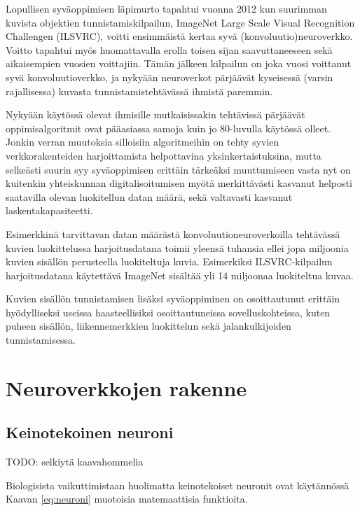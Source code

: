 \documentclass[finnish]{tktltiki2}
\theoremstyle{definition}
\theoremstyle{remark}
\begin{document}
  Lopullisen syväoppimisen läpimurto tapahtui vuonna 2012 kun suurimman kuvista objektien tunnistamiskilpailun, ImageNet Large Scale Visual Recognition Challengen (ILSVRC), voitti ensimmäistä kertaa syvä (konvoluutio)neuroverkko. Voitto tapahtui myös huomattavalla erolla toisen sijan saavuttaneeseen sekä aikaisempien vuosien voittajiin. Tämän jälkeen kilpailun on joka vuosi voittanut syvä konvoluutioverkko, ja nykyään neuroverkot pärjäävät kyseisessä (varsin rajallisessa) kuvasta tunnistamistehtävässä ihmistä paremmin.

  Nykyään käytössä olevat ihmisille mutkaisissakin tehtävissä pärjäävät oppimisalgoritmit ovat pääasiassa samoja kuin jo 80-luvulla käytössä olleet. Jonkin verran muutoksia silloisiin algoritmeihin on tehty syvien verkkorakenteiden harjoittamista helpottavina yksinkertaistuksina, mutta selkeästi suurin syy syväoppimisen erittäin tärkeäksi muuttumiseen vasta nyt on kuitenkin yhteiskunnan digitalisoitumisen myötä merkittävästi kasvanut helposti saatavilla olevan luokitellun datan määrä, sekä valtavasti kasvanut laskentakapasiteetti.

  Esimerkkinä tarvittavan datan määrästä konvoluutioneuroverkoilla tehtävässä kuvien luokittelussa harjoitusdatana toimii yleensä tuhansia ellei jopa miljoonia kuvien sisällön perusteella luokiteltuja kuvia. Esimerkiksi ILSVRC-kilpailun harjoitusdatana käytettävä ImageNet sisältää yli 14 miljoonaa luokiteltua kuvaa.

  Kuvien sisällön tunnistamisen lisäksi syväoppiminen on osoittautunut erittäin hyödylliseksi useissa haasteellisiksi osoittautuneissa sovelluskohteissa, kuten puheen sisällön, liikennemerkkien luokittelun sekä jalankulkijoiden tunnistamisessa.


  \section{Neuroverkkojen rakenne}
  \subsection{Keinotekoinen neuroni}

    TODO: selkiytä kaavahommelia

    Biologisista vaikuttimistaan huolimatta keinotekoiset neuronit ovat käytännössä Kaavan \ref{eq:neuroni} muotoisia matemaattisia funktioita.
\end{document}
